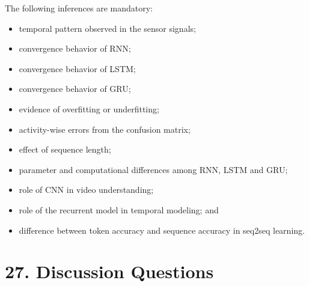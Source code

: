 \documentclass[10pt]{article}
\begin{document}
The following inferences are mandatory:

\begin{itemize}
\item temporal pattern observed in the sensor signals;
\item convergence behavior of RNN;
\item convergence behavior of LSTM;
\item convergence behavior of GRU;
\item evidence of overfitting or underfitting;
\item activity-wise errors from the confusion matrix;
\item effect of sequence length;
\item parameter and computational differences among RNN, LSTM and GRU;
\item role of CNN in video understanding;
\item role of the recurrent model in temporal modeling; and
\item difference between token accuracy and sequence accuracy in seq2seq learning.
\end{itemize}

\section*{27. Discussion Questions}
\end{document}
